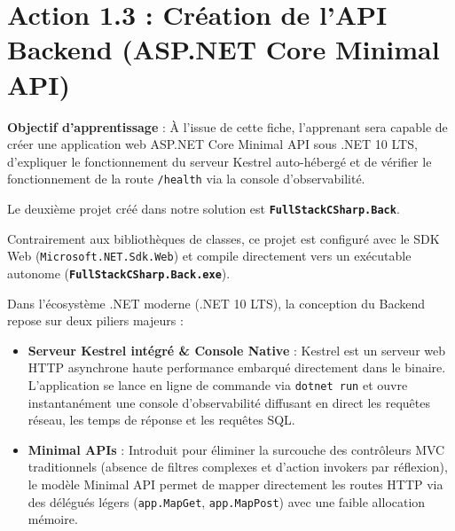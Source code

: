\section{Action 1.3 : Création de l'API Backend (ASP.NET Core Minimal API)}

\begin{tcolorbox}[colback=indigo!4!white,colframe=indigo!40!white,arc=2mm,boxrule=0.8pt,top=2mm,bottom=2mm,left=3mm,right=3mm]
    \small\textbf{\color{indigo!90!black}Objectif d'apprentissage} : À l'issue de cette fiche, l'apprenant sera capable de créer une application web ASP.NET Core Minimal API sous .NET 10 LTS, d'expliquer le fonctionnement du serveur Kestrel auto-hébergé et de vérifier le fonctionnement de la route \texttt{/health} via la console d'observabilité.
\end{tcolorbox}

\vspace{0.1cm}

Le deuxième projet créé dans notre solution est \textbf{\texttt{FullStackCSharp.Back}}. 

Contrairement aux bibliothèques de classes, ce projet est configuré avec le SDK Web (\texttt{Microsoft.NET.Sdk.Web}) et compile directement vers un exécutable autonome (\textbf{\texttt{FullStackCSharp.Back.exe}}).

Dans l'écosystème .NET moderne (.NET 10 LTS), la conception du Backend repose sur deux piliers majeurs :
\begin{itemize}
    \item \textbf{Serveur Kestrel intégré \& Console Native} : Kestrel est un serveur web HTTP asynchrone haute performance embarqué directement dans le binaire. L'application se lance en ligne de commande via \texttt{dotnet run} et ouvre instantanément une console d'observabilité diffusant en direct les requêtes réseau, les temps de réponse et les requêtes SQL.
    \item \textbf{Minimal APIs} : Introduit pour éliminer la surcouche des contrôleurs MVC traditionnels (absence de filtres complexes et d'action invokers par réflexion), le modèle Minimal API permet de mapper directement les routes HTTP via des délégués légers (\texttt{app.MapGet}, \texttt{app.MapPost}) avec une faible allocation mémoire.
\end{itemize}

\vspace{0.3cm}

